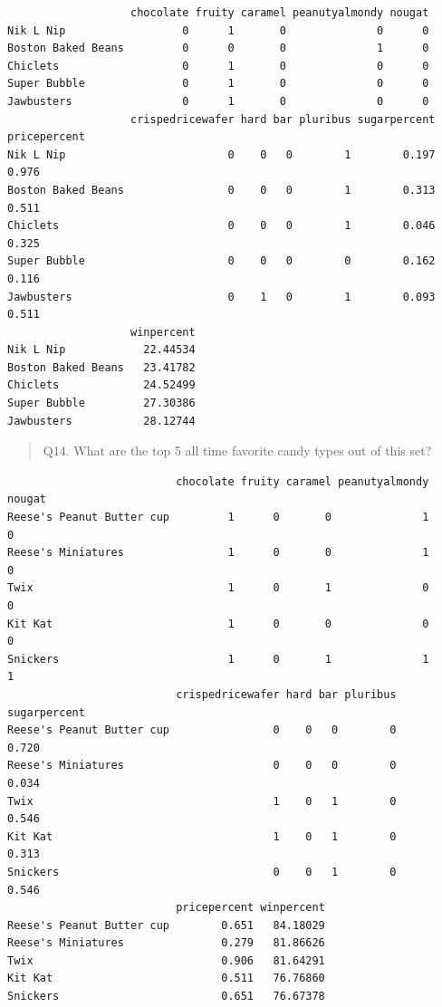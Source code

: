 \documentclass[
  letterpaper,
  DIV=11,
  numbers=noendperiod]{scrartcl}
\newenvironment{Shaded}{\begin{snugshade}}{\end{snugshade}}
\newcommand{\AttributeTok}[1]{\textcolor[rgb]{0.40,0.45,0.13}{#1}}
\newcommand{\ConstantTok}[1]{\textcolor[rgb]{0.56,0.35,0.01}{#1}}
\newcommand{\DecValTok}[1]{\textcolor[rgb]{0.68,0.00,0.00}{#1}}
\newcommand{\FunctionTok}[1]{\textcolor[rgb]{0.28,0.35,0.67}{#1}}
\newcommand{\NormalTok}[1]{\textcolor[rgb]{0.00,0.23,0.31}{#1}}
\newcommand{\SpecialCharTok}[1]{\textcolor[rgb]{0.37,0.37,0.37}{#1}}
\begin{document}
\begin{verbatim}
                   chocolate fruity caramel peanutyalmondy nougat
Nik L Nip                  0      1       0              0      0
Boston Baked Beans         0      0       0              1      0
Chiclets                   0      1       0              0      0
Super Bubble               0      1       0              0      0
Jawbusters                 0      1       0              0      0
                   crispedricewafer hard bar pluribus sugarpercent pricepercent
Nik L Nip                         0    0   0        1        0.197        0.976
Boston Baked Beans                0    0   0        1        0.313        0.511
Chiclets                          0    0   0        1        0.046        0.325
Super Bubble                      0    0   0        0        0.162        0.116
Jawbusters                        0    1   0        1        0.093        0.511
                   winpercent
Nik L Nip            22.44534
Boston Baked Beans   23.41782
Chiclets             24.52499
Super Bubble         27.30386
Jawbusters           28.12744
\end{verbatim}

\begin{quote}
Q14. What are the top 5 all time favorite candy types out of this set?
\end{quote}

\begin{Shaded}
\end{Shaded}

\begin{verbatim}
                          chocolate fruity caramel peanutyalmondy nougat
Reese's Peanut Butter cup         1      0       0              1      0
Reese's Miniatures                1      0       0              1      0
Twix                              1      0       1              0      0
Kit Kat                           1      0       0              0      0
Snickers                          1      0       1              1      1
                          crispedricewafer hard bar pluribus sugarpercent
Reese's Peanut Butter cup                0    0   0        0        0.720
Reese's Miniatures                       0    0   0        0        0.034
Twix                                     1    0   1        0        0.546
Kit Kat                                  1    0   1        0        0.313
Snickers                                 0    0   1        0        0.546
                          pricepercent winpercent
Reese's Peanut Butter cup        0.651   84.18029
Reese's Miniatures               0.279   81.86626
Twix                             0.906   81.64291
Kit Kat                          0.511   76.76860
Snickers                         0.651   76.67378
\end{verbatim}
\end{document}
